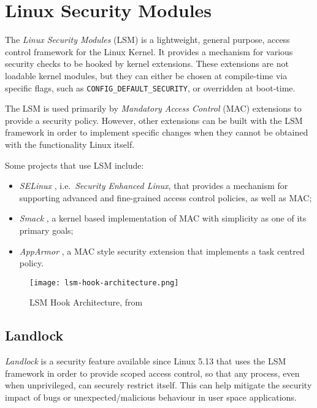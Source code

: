 \section{Linux Security Modules}

The \textit{Linux Security Modules} (LSM) \cite{lsm-2002, kernel-lsm}
is a lightweight, general purpose, access control framework for the Linux Kernel.
It provides a mechanism for various security checks to be hooked by kernel extensions.
These extensions are not loadable kernel modules, but they can either be chosen at
compile-time via specific flags, such as \texttt{CONFIG\_DEFAULT\_SECURITY}, or overridden at boot-time.

The LSM is used primarily by \textit{Mandatory Access Control} (MAC) extensions to
provide a security policy. However, other extensions can be built with the LSM framework
in order to implement specific changes when they cannot be obtained with the functionality Linux itself.

Some projects that use LSM include:
\begin{itemize}
  \item \textit{SELinux} \cite{selinux}, i.e.\ \textit{Security Enhanced Linux}, that provides a mechanism for supporting advanced and fine-grained access control policies, as well as MAC;
  \item \textit{Smack} \cite{smack}, a kernel based implementation of MAC with simplicity as one of its primary goals;
  \item \textit{AppArmor} \cite{apparmor}, a MAC style security extension that implements a task centred policy.
\end{itemize}

\begin{figure}[ht]
  \centering
  \texttt{[image: lsm-hook-architecture.png]}
  \caption{LSM Hook Architecture, from \cite{kernel-lsm}}
  \label{fig:lsm-hook-architecture}
\end{figure}

\subsection{Landlock}
\textit{Landlock} \cite{landlock-kernel, landlock-user-space} is a security feature available since Linux 5.13
that uses the LSM framework in order to provide scoped access control,
so that any process, even when unprivileged, can securely restrict itself.
This can help mitigate the security impact of bugs or unexpected/malicious behaviour
in user space applications.

